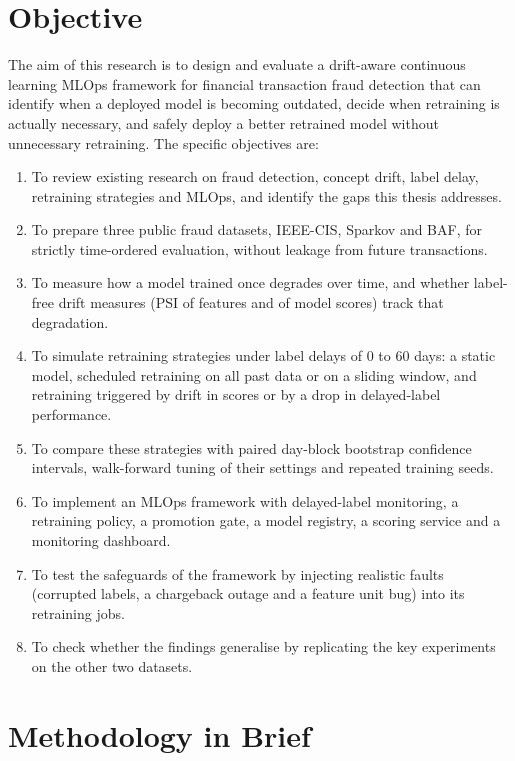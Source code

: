 \section{Objective}

The aim of this research is to design and evaluate a drift-aware continuous learning MLOps framework for financial transaction fraud detection that can identify when a deployed model is becoming outdated, decide when retraining is actually necessary, and safely deploy a better retrained model without unnecessary retraining. The specific objectives are:

\begin{enumerate}
  \item To review existing research on fraud detection, concept drift, label delay, retraining strategies and MLOps, and identify the gaps this thesis addresses.
  \item To prepare three public fraud datasets, IEEE-CIS, Sparkov and BAF, for strictly time-ordered evaluation, without leakage from future transactions.
  \item To measure how a model trained once degrades over time, and whether label-free drift measures (PSI of features and of model scores) track that degradation.
  \item To simulate retraining strategies under label delays of 0 to 60 days: a static model, scheduled retraining on all past data or on a sliding window, and retraining triggered by drift in scores or by a drop in delayed-label performance.
  \item To compare these strategies with paired day-block bootstrap confidence intervals, walk-forward tuning of their settings and repeated training seeds.
  \item To implement an MLOps framework with delayed-label monitoring, a retraining policy, a promotion gate, a model registry, a scoring service and a monitoring dashboard.
  \item To test the safeguards of the framework by injecting realistic faults (corrupted labels, a chargeback outage and a feature unit bug) into its retraining jobs.
  \item To check whether the findings generalise by replicating the key experiments on the other two datasets.
\end{enumerate}

\section{Methodology in Brief}

